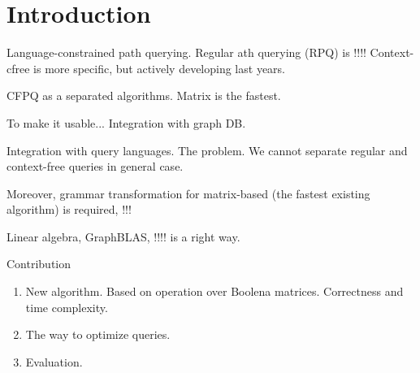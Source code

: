 \section{Introduction}


Language-constrained path querying. 
Regular ath querying (RPQ) is !!!!
Context-cfree is more specific, but actively developing last years.

CFPQ as a separated algorithms. Matrix is the fastest. 

To make it usable... Integration with graph DB.

Integration with query languages. 
The problem. We cannot separate regular and context-free queries in general case.  

Moreover, grammar transformation for matrix-based (the fastest existing algorithm) is required, !!!

Linear algebra, GraphBLAS, !!!! is a right way.



Contribution
\begin{enumerate}
	\item New algorithm. Based on operation over Boolena matrices. Correctness and time complexity.
	\item The way to optimize queries.
	\item Evaluation.
\end{enumerate}
